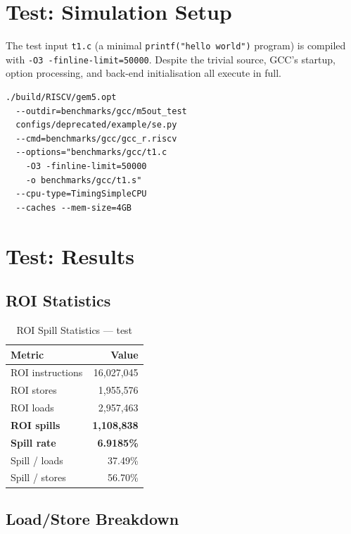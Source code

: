 \documentclass[conference]{IEEEtran}
\begin{document}
\section{Test: Simulation Setup}

The test input \texttt{t1.c} (a minimal \texttt{printf("hello world")}
program) is compiled with \texttt{-O3 -finline-limit=50000}. Despite
the trivial source, GCC's startup, option processing, and back-end
initialisation all execute in full.

\begin{verbatim}
./build/RISCV/gem5.opt
  --outdir=benchmarks/gcc/m5out_test
  configs/deprecated/example/se.py
  --cmd=benchmarks/gcc/gcc_r.riscv
  --options="benchmarks/gcc/t1.c
    -O3 -finline-limit=50000
    -o benchmarks/gcc/t1.s"
  --cpu-type=TimingSimpleCPU
  --caches --mem-size=4GB
\end{verbatim}

\section{Test: Results}

\subsection{ROI Statistics}

\begin{table}[H]
\centering
\caption{ROI Spill Statistics --- test}
\label{tab:test_roi}
\begin{tabular}{lr}
\toprule
\textbf{Metric} & \textbf{Value} \\
\midrule
ROI instructions    & 16,027,045 \\
ROI stores          & 1,955,576 \\
ROI loads           & 2,957,463 \\
\midrule
\textbf{ROI spills} & \textbf{1,108,838} \\
\textbf{Spill rate} & \textbf{6.9185\%} \\
Spill / loads       & 37.49\% \\
Spill / stores      & 56.70\% \\
\bottomrule
\end{tabular}
\end{table}

\subsection{Load/Store Breakdown}
\end{document}
